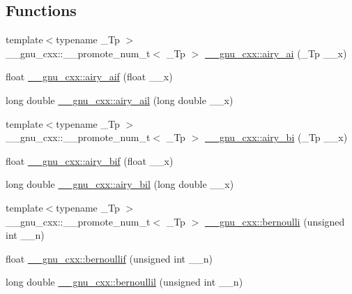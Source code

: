 \subsection*{Functions}
\begin{DoxyCompactItemize}
\item 
{\footnotesize template$<$typename \+\_\+\+Tp $>$ }\\\+\_\+\+\_\+gnu\+\_\+cxx\+::\+\_\+\+\_\+promote\+\_\+num\+\_\+t$<$ \+\_\+\+Tp $>$ \hyperlink{group__gnu__math__spec__func_ga8eff81346e95e9987002ea52fe1e29a7}{\+\_\+\+\_\+gnu\+\_\+cxx\+::airy\+\_\+ai} (\+\_\+\+Tp \+\_\+\+\_\+x)
\item 
float \hyperlink{group__gnu__math__spec__func_gaf317ba724c44b3a8271fe341d9870173}{\+\_\+\+\_\+gnu\+\_\+cxx\+::airy\+\_\+aif} (float \+\_\+\+\_\+x)
\item 
long double \hyperlink{group__gnu__math__spec__func_ga800fdb61c672ae1831f4ca4250d657de}{\+\_\+\+\_\+gnu\+\_\+cxx\+::airy\+\_\+ail} (long double \+\_\+\+\_\+x)
\item 
{\footnotesize template$<$typename \+\_\+\+Tp $>$ }\\\+\_\+\+\_\+gnu\+\_\+cxx\+::\+\_\+\+\_\+promote\+\_\+num\+\_\+t$<$ \+\_\+\+Tp $>$ \hyperlink{group__gnu__math__spec__func_ga65253611eb5aec804f9021b085be2a48}{\+\_\+\+\_\+gnu\+\_\+cxx\+::airy\+\_\+bi} (\+\_\+\+Tp \+\_\+\+\_\+x)
\item 
float \hyperlink{group__gnu__math__spec__func_ga2ade465827bdba7370abbcce78e54912}{\+\_\+\+\_\+gnu\+\_\+cxx\+::airy\+\_\+bif} (float \+\_\+\+\_\+x)
\item 
long double \hyperlink{group__gnu__math__spec__func_ga59240b3f40177e5187f3f194f624f0f8}{\+\_\+\+\_\+gnu\+\_\+cxx\+::airy\+\_\+bil} (long double \+\_\+\+\_\+x)
\item 
{\footnotesize template$<$typename \+\_\+\+Tp $>$ }\\\+\_\+\+\_\+gnu\+\_\+cxx\+::\+\_\+\+\_\+promote\+\_\+num\+\_\+t$<$ \+\_\+\+Tp $>$ \hyperlink{group__gnu__math__spec__func_ga3fc87e918adf978bfdc26a182af0e6ed}{\+\_\+\+\_\+gnu\+\_\+cxx\+::bernoulli} (unsigned int \+\_\+\+\_\+n)
\item 
float \hyperlink{group__gnu__math__spec__func_gabcd77f012ae74989c4bb9ca61978481d}{\+\_\+\+\_\+gnu\+\_\+cxx\+::bernoullif} (unsigned int \+\_\+\+\_\+n)
\item 
long double \hyperlink{group__gnu__math__spec__func_gaac8f04abfdd6b744d11cb73ec1f564b1}{\+\_\+\+\_\+gnu\+\_\+cxx\+::bernoullil} (unsigned int \+\_\+\+\_\+n)
\item 

\end{DoxyCompactItemize}
